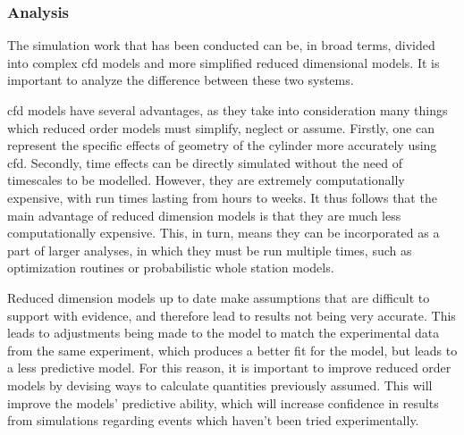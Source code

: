 

\subsubsection{Analysis}


The simulation work that has been conducted can be, in broad terms, divided into complex \gls{cfd} models and more simplified reduced dimensional models. It is important to analyze the difference between these two systems. 




\Gls{cfd} models have several advantages, as they take into consideration many things which reduced order models must simplify, neglect or assume. Firstly, one can represent the specific effects of geometry of the cylinder more accurately using \gls{cfd}. Secondly, time effects can be directly simulated without the need of timescales  to be modelled. However, they are extremely computationally expensive, with run times lasting from hours to weeks. It thus follows that the main advantage of reduced dimension models is that they are much less computationally expensive. This, in turn, means they can be incorporated as a part of larger analyses, in which they must be run multiple times, such as optimization routines or probabilistic whole station models.


Reduced dimension models up to date make assumptions that are difficult to support with evidence, and therefore  lead to results not being very accurate. This leads to adjustments being made to the model to match the experimental data from the same experiment, which produces a better fit for the model, but leads to a less predictive model. For this reason, it is important to improve reduced order models by devising ways to calculate quantities previously assumed. This will improve the models' predictive ability, which will increase confidence in results from simulations regarding events which haven't been tried experimentally.


